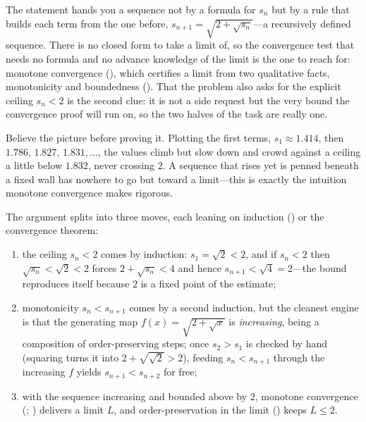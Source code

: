 \documentclass[main.tex]{subfiles}
\begin{document}
\begin{Reflection}
The statement hands you a sequence not by a formula for $s_{n}$ but by a rule that builds each term
from the one before, $s_{n+1}=\sqrt{2+\sqrt{s_{n}}}$---a recursively defined sequence. There is no
closed form to take a limit of, so the convergence test that needs no formula and no advance knowledge
of the limit is the one to reach for: monotone convergence (), which certifies a limit
from two qualitative facts, monotonicity and boundedness (). That the problem also asks
for the explicit ceiling $s_{n}<2$ is the second clue: it is not a side request but the very bound the
convergence proof will run on, so the two halves of the task are really one.

Believe the picture before proving it. Plotting the first terms, $s_{1}\approx1.414$, then
$1.786,\,1.827,\,1.831,\dots$, the values climb but slow down and crowd against a ceiling a little
below $1.832$, never crossing $2$. A sequence that rises yet is penned beneath a fixed wall has nowhere
to go but toward a limit---this is exactly the intuition monotone convergence makes rigorous.

The argument splits into three moves, each leaning on induction () or the convergence
theorem:
\begin{enumerate}[leftmargin=1.7em,itemsep=3pt,topsep=2pt,label=\textnormal{(\arabic*)}]
  \item the ceiling $s_{n}<2$ comes by induction: $s_{1}=\sqrt 2<2$, and if $s_{n}<2$ then
        $\sqrt{s_{n}}<\sqrt2<2$ forces $2+\sqrt{s_{n}}<4$ and hence $s_{n+1}<\sqrt 4=2$---the bound
        reproduces itself because $2$ is a fixed point of the estimate;
  \item monotonicity $s_{n}<s_{n+1}$ comes by a second induction, but the cleanest engine is that the
        generating map $f(x)=\sqrt{2+\sqrt x}$ is \emph{increasing}, being a composition of
        order-preserving steps; once $s_{2}>s_{1}$ is checked by hand (squaring turns it into
        $2+\sqrt{\sqrt2}>2$), feeding $s_{n}<s_{n+1}$ through the increasing $f$ yields
        $s_{n+1}<s_{n+2}$ for free;
  \item with the sequence increasing and bounded above by $2$, monotone convergence
        (; ) delivers a limit
        $L$, and order-preservation in the limit () keeps $L\le 2$.
\end{enumerate}


\end{Reflection}
\end{document}
